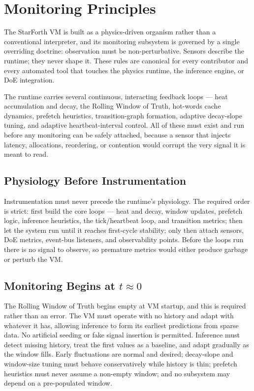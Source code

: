 
\section{Monitoring Principles}

The StarForth VM is built as a physics-driven organism rather than a
conventional interpreter, and its monitoring subsystem is governed by a single
overriding doctrine: observation must be non-perturbative. Sensors describe the
runtime; they never shape it. These rules are canonical for every contributor
and every automated tool that touches the physics runtime, the inference engine,
or DoE integration.

The runtime carries several continuous, interacting feedback loops --- heat
accumulation and decay, the Rolling Window of Truth, hot-words cache dynamics,
prefetch heuristics, transition-graph formation, adaptive decay-slope tuning,
and adaptive heartbeat-interval control. All of these must exist and run before
any monitoring can be safely attached, because a sensor that injects latency,
allocations, reordering, or contention would corrupt the very signal it is meant
to read.

\subsection{Physiology Before Instrumentation}

Instrumentation must never precede the runtime's physiology. The required order
is strict: first build the core loops --- heat and decay, window updates,
prefetch logic, inference heuristics, the tick/heartbeat loop, and transition
metrics; then let the system run until it reaches first-cycle stability; only
then attach sensors, DoE metrics, event-bus listeners, and observability points.
Before the loops run there is no signal to observe, so premature metrics would
either produce garbage or perturb the VM.

\subsection{Monitoring Begins at $t \approx 0$}

The Rolling Window of Truth begins empty at VM startup, and this is required
rather than an error. The VM must operate with no history and adapt with
whatever it has, allowing inference to form its earliest predictions from sparse
data. No artificial seeding or fake signal insertion is permitted. Inference
must detect missing history, treat the first values as a baseline, and adapt
gradually as the window fills. Early fluctuations are normal and desired;
decay-slope and window-size tuning must behave conservatively while history is
thin; prefetch heuristics must never assume a non-empty window; and no subsystem
may depend on a pre-populated window.


